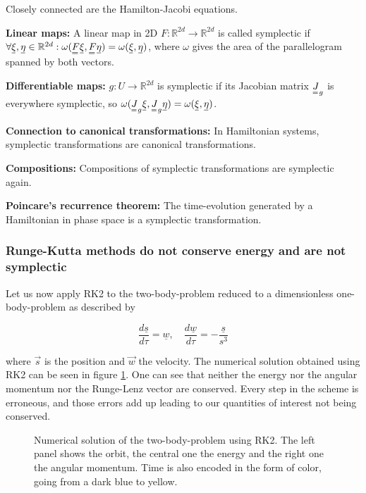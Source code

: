 Closely connected are the Hamilton-Jacobi equations.

\textbf{Linear maps:} A linear map in 2D $F:\mathbb{R}^{2d}\rightarrow\mathbb{R}^{2d}$ is called symplectic if $\forall \vec{\xi},\vec{\eta} \in \mathbb{R}^{2d}: \omega(\mat{F}\vec{\xi},\mat{F}\vec{\eta}) = \omega(\vec{\xi},\vec{\eta})$, where
$\omega$ gives the area of the parallelogram spanned by both vectors.

\textbf{Differentiable maps:} $g: U \rightarrow \mathbb{R}^{2d}$ is symplectic if its Jacobian matrix $\mat{J}_g$ is everywhere symplectic, so 
$\omega(\mat{J}_g\vec{\xi},\mat{J}_g\vec{\eta}) = \omega(\vec{\xi},\vec{\eta})$.

\textbf{Connection to canonical transformations:} In Hamiltonian systems, symplectic transformations are canonical transformations.

\textbf{Compositions:} Compositions of symplectic transformations are symplectic again.

\textbf{Poincare's recurrence theorem:} The time-evolution generated by a Hamiltonian in phase space is a symplectic transformation.


\subsubsection{Runge-Kutta methods do not conserve energy and are not symplectic}
Let us now apply RK2 to the two-body-problem reduced to a dimensionless one-body-problem as described by

\[
\frac{d \underline{s}}{d \tau}=\underline{w}, \quad \frac{d \underline{w}}{d \tau}=-\frac{\underline{s}}{s^3}
\]

where $\vec{s}$ is the position and $\vec{w}$ the velocity. The numerical solution obtained using RK2 can be seen in figure \ref{fig:rk2_orbit}. One can see that neither the energy nor the angular momentum nor the Runge-Lenz vector are conserved. Every step in the scheme is erroneous, and those errors add up leading to our quantities of interest not being conserved.

\begin{figure}[!htb]
  \centering
  \hfill
  \caption{Numerical solution of the two-body-problem using RK2. The left panel shows the orbit, the central one the energy and the right one the angular momentum. Time is also encoded in the form of color, going from a dark blue to yellow.}
  \label{fig:rk2_orbit}
\end{figure}

